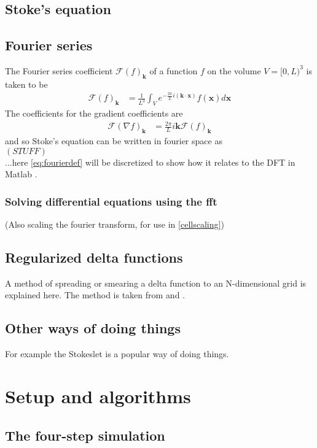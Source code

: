 \documentclass[a4paper,twoside=false,abstract=false,numbers=noenddot,
titlepage=false,headings=small,parskip=half,version=last]{scrartcl}
\begin{document}
\subsection{Stoke's equation}
\subsection{Fourier series}
The Fourier series coefficient $\mathcal{F}(f)_{\mathbf{k}}$ of a function $f$ on the volume $V=[0,L)^3$ is taken to be
\begin{align}
\mathcal{F}(f)_{\mathbf{k}} &= \frac{1}{L^3} \int_V e^{-\frac{2\pi}{L}i(\mathbf{k}\cdot \mathbf{x})}f(\mathbf{x})d\mathbf{x}
    \label{eq:fourierdef}
\end{align}
The coefficients for the gradient coefficients are
\begin{align}
\mathcal{F}(\nabla f)_{\mathbf{k}} &= \frac{2\pi}{L}i\mathbf{k} \mathcal{F}(f)_{\mathbf{k}}
\end{align}
and so Stoke's equation can be written in fourier space as \\
$\left(STUFF\right)$\\
...here \eqref{eq:fourierdef} will be discretized to show how it relates to the DFT in Matlab \cite{matlabdft}.

\subsubsection{Solving differential equations using the fft}
(Also scaling the fourier transform, for use in \ref{cellscaling})
\subsection{Regularized delta functions}
A method of spreading or smearing a delta function to an N-dimensional grid is explained here. The method is taken from \cite{spectralewald} and \cite{interfaceregularization}.
\subsection{Other ways of doing things}
For example the Stokeslet is a popular way of doing things.

\section{Setup and algorithms}
\subsection{The four-step simulation}
\end{document}
